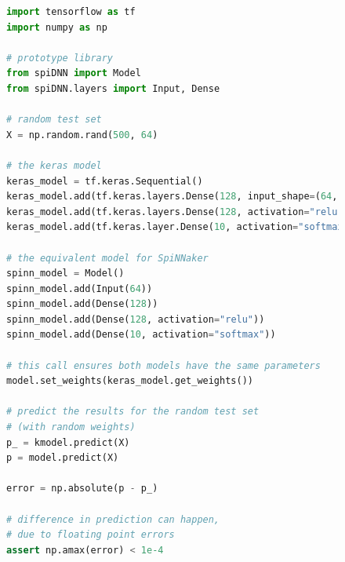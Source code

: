 \documentclass[]{article}
\begin{document}
\begin{figure}
\begin{lstlisting}[language=Python, caption={Example code comparing
  Keras to the prototype. The code would result in a model akin to the
  one shown in Figure~\ref{fig:spiDNN_arch}.}, captionpos=b,
  label=lst:spiDNN_vs_keras]
import tensorflow as tf
import numpy as np

# prototype library
from spiDNN import Model
from spiDNN.layers import Input, Dense

# random test set
X = np.random.rand(500, 64)

# the keras model
keras_model = tf.keras.Sequential()
keras_model.add(tf.keras.layers.Dense(128, input_shape=(64,)))
keras_model.add(tf.keras.layers.Dense(128, activation="relu"))
keras_model.add(tf.keras.layer.Dense(10, activation="softmax"))

# the equivalent model for SpiNNaker
spinn_model = Model()
spinn_model.add(Input(64))
spinn_model.add(Dense(128))
spinn_model.add(Dense(128, activation="relu"))
spinn_model.add(Dense(10, activation="softmax"))

# this call ensures both models have the same parameters
model.set_weights(keras_model.get_weights())

# predict the results for the random test set
# (with random weights)
p_ = kmodel.predict(X)
p = model.predict(X)

error = np.absolute(p - p_)

# difference in prediction can happen,
# due to floating point errors
assert np.amax(error) < 1e-4
\end{lstlisting}
\end{figure}
\end{document}
